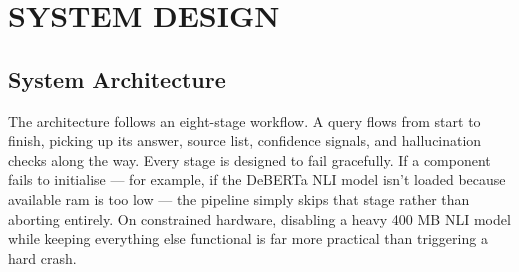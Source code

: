 \chapter{\MakeUppercase{System Design}}

\section{System Architecture}

The architecture follows an eight-stage workflow. A query flows from start to finish, picking up its answer, source list, confidence signals, and hallucination checks along the way. Every stage is designed to fail gracefully. If a component fails to initialise --- for example, if the DeBERTa NLI model isn't loaded because available \ac{ram} is too low --- the pipeline simply skips that stage rather than aborting entirely. On constrained hardware, disabling a heavy 400 MB NLI model while keeping everything else functional is far more practical than triggering a hard crash.

